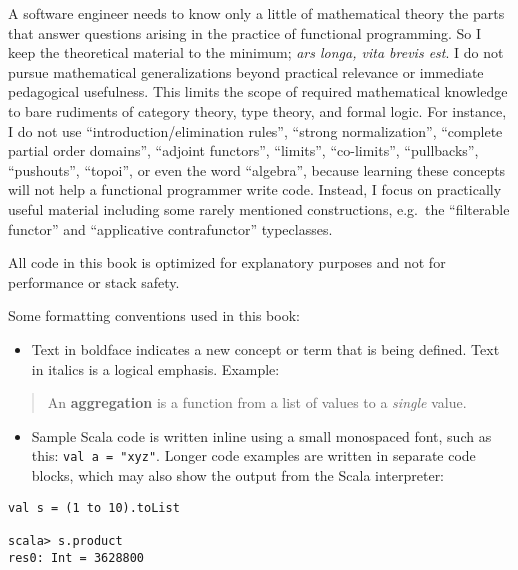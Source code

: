 A software engineer needs to know only a little of mathematical theory
\textendash{} the parts that answer questions arising in the practice
of functional programming. So I keep the theoretical material to the
minimum; \emph{ars longa, vita brevis est}. I do not pursue mathematical
generalizations beyond practical relevance or immediate pedagogical
usefulness. This limits the scope of required mathematical knowledge
to bare rudiments of category theory, type theory, and formal logic.
For instance, I do not use ``introduction/elimination rules'', ``strong
normalization'', ``complete partial order domains'', ``adjoint
functors'', ``limits'', ``co-limits'', ``pullbacks'', ``pushouts'',
``topoi'', or even the word ``algebra'', because learning these
concepts will not help a functional programmer write code. Instead,
I focus on practically useful material \textendash{} including some
rarely mentioned constructions, e.g.~the ``filterable functor''
and ``applicative contrafunctor'' typeclasses.

All code in this book is optimized for explanatory purposes and not
for performance or stack safety.

Some formatting conventions used in this book:
\begin{itemize}
\item Text in boldface indicates a new concept or term that is being defined.
Text in italics is a logical emphasis. Example:
\end{itemize}
\begin{quotation}
An \textbf{aggregation} is a function from a list
of values to a \emph{single} value.
\end{quotation}
\begin{itemize}
\item Sample Scala code is written inline using a small monospaced font,
such as this: \lstinline!val a = "xyz"!. Longer code examples are
written in separate code blocks, which may also show the output from
the Scala interpreter:
\end{itemize}
\begin{lstlisting}
val s = (1 to 10).toList

scala> s.product
res0: Int = 3628800 
\end{lstlisting}

